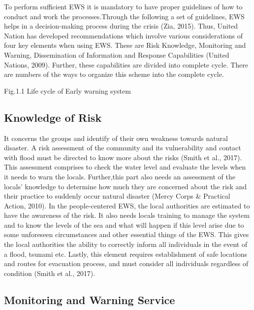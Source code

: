To perform sufficient EWS it  is mandatory to have proper guidelines of how to conduct and work the processes.Through the following a set of guidelines, EWS  helps in a decision-making process during  the crisis (Zia, 2015). Thus, United Nation has developed recommendations which involve various considerations of four key elements when using EWS. These are Risk Knowledge, Monitoring and Warning, Dissemination of Information and Response Capabilities (United Nations, 2009).  Further, these capabilities are divided into complete cycle. There are numbers of the ways to organize this scheme into the complete cycle.
 
                                          
Fig.1.1  Life cycle of Early warning system
\subsection{Knowledge of Risk}\label{sec:Knowledge of risk}
 It concerns the groups and  identify of their own weakness towards  natural disaster. A risk assessment of the community and its vulnerability and contact with  flood must be directed  to know more about the risks (Smith et al., 2017). This assessment comprises  to check the water level and evaluate the levels  when it needs to warn the locals. Further,this part also needs an assessment of the locals’ knowledge to determine how much they are concerned about the risk and their practice to suddenly occur natural disaster (Mercy Corps & Practical Action, 2010). 
In the people-centered EWS, the local authorities are estimated  to have the awareness of the risk. It also needs  locals training to manage the system and to know the levels of the sea and what will happen if this level arise due to some unforeseen circumstances and other essential things of the EWS. This gives the local authorities the ability to correctly inform all individuals in the event of a flood, tsunami etc. Lastly, this element requires establishment of safe locations and routes for evacuation process, and must consider all individuals regardless of condition (Smith et al., 2017). 

\subsection{Monitoring and Warning Service}\label{sec: Monitoring and warning service}
 
